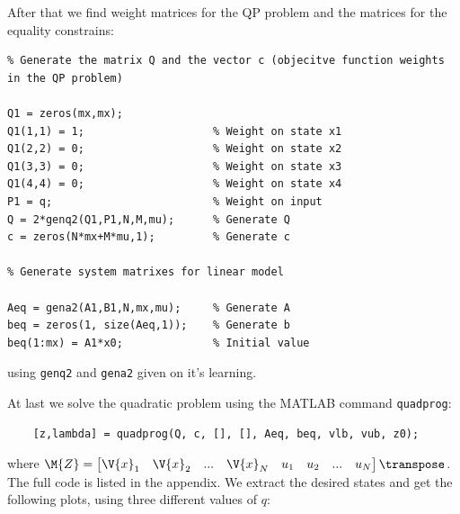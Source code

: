 After that we find weight matrices for the QP problem and the matrices for the equality constrains:
\begin{lstlisting}
% Generate the matrix Q and the vector c (objecitve function weights in the QP problem) 

Q1 = zeros(mx,mx);
Q1(1,1) = 1;                	% Weight on state x1
Q1(2,2) = 0;                	% Weight on state x2
Q1(3,3) = 0;                	% Weight on state x3
Q1(4,4) = 0;                	% Weight on state x4
P1 = q;                     	% Weight on input
Q = 2*genq2(Q1,P1,N,M,mu);  	% Generate Q
c = zeros(N*mx+M*mu,1);     	% Generate c

% Generate system matrixes for linear model

Aeq = gena2(A1,B1,N,mx,mu); 	% Generate A
beq = zeros(1, size(Aeq,1));	% Generate b
beq(1:mx) = A1*x0; 	        	% Initial value
\end{lstlisting}
using \texttt{genq2} and \texttt{gena2} given on it's learning.

At last we solve the quadratic problem using the MATLAB command \texttt{quadprog}:

\begin{lstlisting}
	[z,lambda] = quadprog(Q, c, [], [], Aeq, beq, vlb, vub, z0);
\end{lstlisting}
where $\M{Z} = \begin{bmatrix} \V{x}_1 & \V{x}_2 & ... & \V{x}_N & u_1 & u_2 & ... & u_N \end{bmatrix} \transpose$. The full code is listed in the appendix. We extract the desired states and get the following plots, using three different values of $q$:


